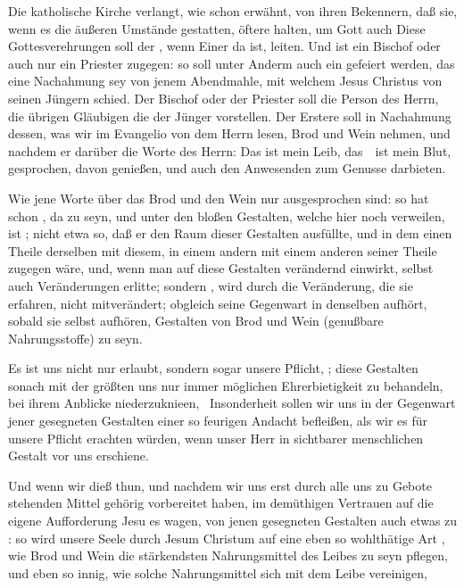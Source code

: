 \begin{aufza}
\item Die katholische Kirche verlangt, wie schon erwähnt, von ihren Bekennern, daß sie, wenn es die äußeren Umstände gestatten, öftere  halten, um Gott auch  Diese Gottesverehrungen soll der , wenn Einer da ist, leiten. Und ist ein Bischof oder auch nur ein Priester zugegen: so soll unter Anderm auch ein  gefeiert werden, das eine Nachahmung sey von jenem Abendmahle, mit welchem Jesus Christus von seinen Jüngern schied. Der Bischof oder der Priester soll die Person des Herrn, die übrigen Gläubigen die der Jünger vorstellen. Der Erstere soll in Nachahmung dessen, was wir im Evangelio von dem Herrn lesen, Brod und Wein nehmen, und nachdem er darüber die Worte des Herrn: Das ist mein Leib, das~\ ist mein Blut, gesprochen, davon genießen, und auch den Anwesenden zum Genusse darbieten.
\item Wie jene Worte über das Brod und den Wein nur ausgesprochen sind: so hat schon , da zu seyn, und unter den bloßen Gestalten, welche hier noch verweilen, ist ; nicht etwa so, daß er den Raum dieser Gestalten ausfüllte, und in dem einen Theile derselben mit diesem, in einem andern mit einem anderen seiner Theile zugegen wäre, und, wenn man auf diese Gestalten verändernd einwirkt, selbst auch Veränderungen erlitte; sondern , wird durch die Veränderung, die sie erfahren, nicht mitverändert; obgleich seine Gegenwart in denselben aufhört, sobald sie selbst aufhören, Gestalten von Brod und Wein (genußbare Nahrungsstoffe) zu seyn.
\item Es ist uns nicht nur erlaubt, sondern sogar unsere Pflicht, ; diese Gestalten sonach mit der größten uns nur immer möglichen Ehrerbietigkeit zu behandeln, bei ihrem Anblicke niederzuknieen, \usw\ Insonderheit sollen wir uns in der Gegenwart jener gesegneten Gestalten einer so feurigen Andacht befleißen, als wir es für unsere Pflicht erachten würden, wenn unser Herr in sichtbarer menschlichen Gestalt vor uns erschiene.
\item Und wenn wir dieß thun, und nachdem wir uns erst durch alle uns zu Gebote stehenden Mittel gehörig vorbereitet haben, im demüthigen Vertrauen auf die eigene Aufforderung Jesu es wagen, von jenen gesegneten Gestalten auch etwas zu : so wird unsere Seele durch Jesum Christum auf eine eben so wohlthätige Art , wie Brod und Wein die stärkendsten Nahrungsmittel des Leibes zu seyn pflegen, und eben so innig, wie solche Nahrungsmittel sich mit dem Leibe vereinigen, 

\end{aufza}
